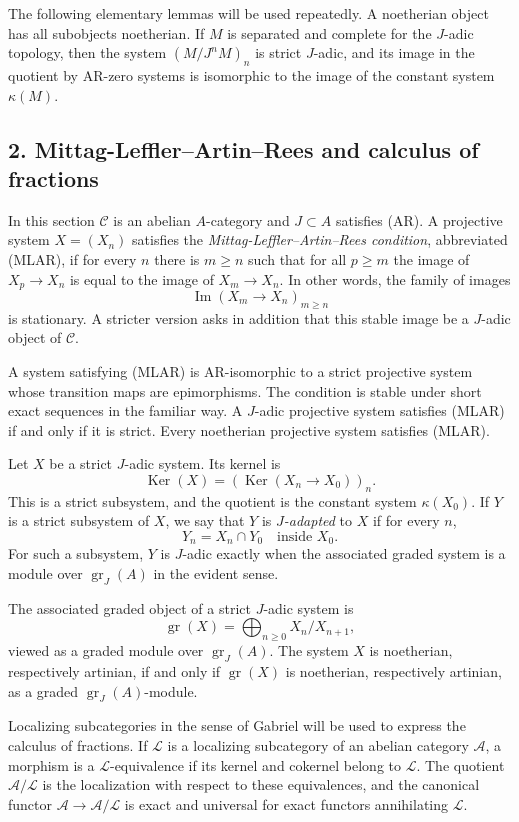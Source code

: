 \documentclass[12pt]{article}
\newcommand{\cA}{\mathcal A}
\newcommand{\cC}{\mathcal C}
\newcommand{\cL}{\mathcal L}
\newcommand{\Ker}{\operatorname{Ker}}
\newcommand{\Imn}{\operatorname{Im}}
\newcommand{\gr}{\operatorname{gr}}
\begin{document}
The following elementary lemmas will be used repeatedly. A noetherian object has all
subobjects noetherian. If $M$ is separated and complete for the $J$-adic topology,
then the system $(M/J^nM)_n$ is strict $J$-adic, and its image in the quotient by
AR-zero systems is isomorphic to the image of the constant system $\kappa(M)$.

\subsection*{2. Mittag-Leffler--Artin--Rees and calculus of fractions}

In this section $\cC$ is an abelian $A$-category and $J\subset A$ satisfies (AR).
A projective system $X=(X_n)$ satisfies the \emph{Mittag-Leffler--Artin--Rees
condition}, abbreviated (MLAR), if for every $n$ there is $m\ge n$ such that for
all $p\ge m$ the image of $X_p\to X_n$ is equal to the image of $X_m\to X_n$.
In other words, the family of images
\[
       \Imn(X_m\to X_n)_{m\ge n}
\]
is stationary. A stricter version asks in addition that this stable image be a
$J$-adic object of $\cC$.

A system satisfying (MLAR) is AR-isomorphic to a strict projective system whose
transition maps are epimorphisms. The condition is stable under short exact
sequences in the familiar way. A $J$-adic projective system satisfies (MLAR) if and
only if it is strict. Every noetherian projective system satisfies (MLAR).

Let $X$ be a strict $J$-adic system. Its kernel is
\[
      \Ker(X)=(\Ker(X_n\to X_0))_n.
\]
This is a strict subsystem, and the quotient is the constant system $\kappa(X_0)$.
If $Y$ is a strict subsystem of $X$, we say that $Y$ is \emph{$J$-adapted} to $X$ if
for every $n$,
\[
      Y_n=X_n\cap Y_0\quad\text{inside }X_0.
\]
For such a subsystem, $Y$ is $J$-adic exactly when the associated graded system is a
module over $\gr_J(A)$ in the evident sense.

The associated graded object of a strict $J$-adic system is
\[
      \gr(X)=\bigoplus_{n\ge0} X_n/X_{n+1},
\]
viewed as a graded module over $\gr_J(A)$. The system $X$ is noetherian,
respectively artinian, if and only if $\gr(X)$ is noetherian, respectively artinian,
as a graded $\gr_J(A)$-module.

Localizing subcategories in the sense of Gabriel will be used to express the
calculus of fractions. If $\cL$ is a localizing subcategory of an abelian category
$\cA$, a morphism is a $\cL$-equivalence if its kernel and cokernel belong to
$\cL$. The quotient $\cA/\cL$ is the localization with respect to these equivalences,
and the canonical functor $\cA\to\cA/\cL$ is exact and universal for exact functors
annihilating $\cL$.
\end{document}
